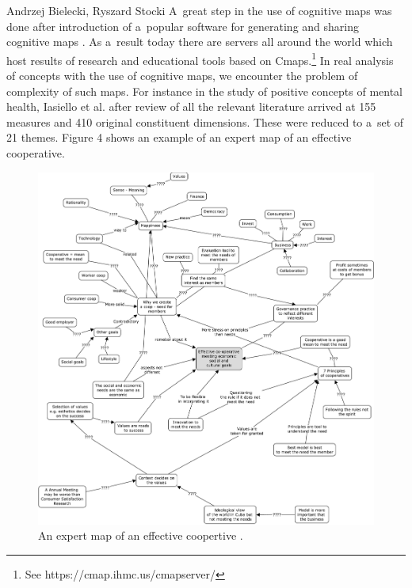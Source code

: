 \begin{artengenv2auth}{Andrzej Bielecki, Ryszard Stocki}
A~great step in the use of cognitive maps was done after introduction of a~popular software for generating and sharing cognitive maps 
\parencite[][]{novak_origins_2006}. %
 As a~result today there are servers all around the world which host results of research and educational tools based on Cmaps.\footnote{See https://cmap.ihmc.us/cmapserver/ } In real analysis of concepts with the use of cognitive maps, we encounter the problem of complexity of such maps. For instance in the study of positive concepts of mental health, Iasiello et al. 
\parencite*[][]{iasiello_whats_2023} %
 after review of all the relevant literature arrived at 155 measures and 410 original constituent dimensions. These were reduced to a~set of 21 themes. Figure 4 shows an example of an expert map of an effective cooperative.



\begin{figure}
 \begin{center}
 \begin{adjustwidth}{-.1\textwidth}{}
 \includegraphics[width=1.2\textwidth]{ART_Bielecki/fig6.pdf}%
 \end{adjustwidth}
 \end{center}%
 \caption{An expert map of an effective coopertive 
 \parencite[][]{stocki_tacit_nodate}.}\label{bie:fig4}
\end{figure}





\end{artengenv2auth}
